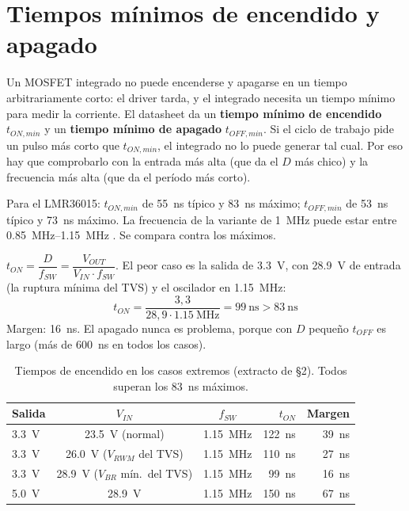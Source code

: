\section{Tiempos mínimos de encendido y apagado}\label{sec:c02-tiempos}

\begin{idea}
Un MOSFET integrado no puede encenderse y apagarse en un tiempo arbitrariamente corto: el driver tarda, y el integrado necesita un tiempo mínimo para medir la corriente. El datasheet da un \textbf{tiempo mínimo de encendido} $t_{ON,min}$ y un \textbf{tiempo mínimo de apagado} $t_{OFF,min}$. Si el ciclo de trabajo pide un pulso más corto que $t_{ON,min}$, el integrado no lo puede generar tal cual. Por eso hay que comprobarlo con la entrada más alta (que da el $D$ más chico) y la frecuencia más alta (que da el período más corto).
\end{idea}

Para el LMR36015: $t_{ON,min}$ de \SI{55}{\nano\second} típico y \SI{83}{\nano\second} máximo; $t_{OFF,min}$ de \SI{53}{\nano\second} típico y \SI{73}{\nano\second} máximo. La frecuencia de la variante de \SI{1}{\mega\hertz} puede estar entre \SIrange{0.85}{1.15}{\mega\hertz} . Se compara contra los máximos.

\begin{calculo}
$t_{ON} = \dfrac{D}{f_{SW}} = \dfrac{V_{OUT}}{V_{IN}\cdot f_{SW}}$. El peor caso es la salida de \SI{3.3}{\volt}, con \SI{28.9}{\volt} de entrada (la ruptura mínima del TVS) y el oscilador en \SI{1.15}{\mega\hertz}:
\[
t_{ON} = \frac{3{,}3}{28{,}9\cdot\SI{1.15}{\mega\hertz}} = \SI{99}{\nano\second} > \SI{83}{\nano\second}
\]
Margen: \SI{16}{\nano\second}. El apagado nunca es problema, porque con $D$ pequeño $t_{OFF}$ es largo (más de \SI{600}{\nano\second} en todos los casos).
\end{calculo}

\begin{table}[htbp]
\centering
\caption{Tiempos de encendido en los casos extremos (extracto de  §2). Todos superan los \SI{83}{\nano\second} máximos.}
\label{tab:c02-ton}
\begin{tabular}{@{}lccrr@{}}
\toprule
\textbf{Salida} & $V_{IN}$ & $f_{SW}$ & $t_{ON}$ & \textbf{Margen}\\
\midrule
\SI{3.3}{\volt} & \SI{23.5}{\volt} (normal) & \SI{1.15}{\mega\hertz} & \SI{122}{\nano\second} & \SI{39}{\nano\second}\\
\SI{3.3}{\volt} & \SI{26.0}{\volt} ($V_{RWM}$ del TVS) & \SI{1.15}{\mega\hertz} & \SI{110}{\nano\second} & \SI{27}{\nano\second}\\
\SI{3.3}{\volt} & \SI{28.9}{\volt} ($V_{BR}$ mín.\ del TVS) & \SI{1.15}{\mega\hertz} & \SI{99}{\nano\second} & \SI{16}{\nano\second}\\
\SI{5.0}{\volt} & \SI{28.9}{\volt} & \SI{1.15}{\mega\hertz} & \SI{150}{\nano\second} & \SI{67}{\nano\second}\\
\bottomrule
\end{tabular}
\end{table}

